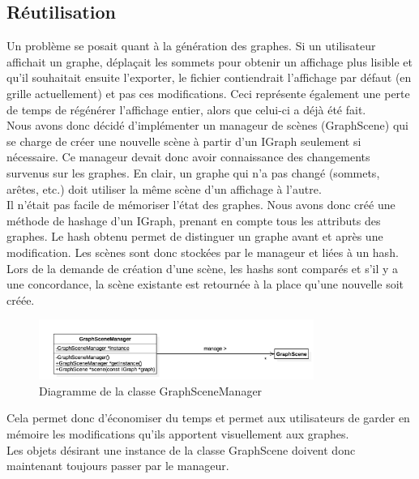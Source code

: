 \documentclass[french]{article}
\begin{document}
		\subsection{Réutilisation}
			Un problème se posait quant à la génération des graphes. Si un utilisateur affichait un graphe, déplaçait les sommets pour obtenir un affichage plus lisible et qu'il souhaitait ensuite l'exporter, le fichier contiendrait l'affichage par défaut (en grille actuellement) et pas ces modifications. Ceci représente également une perte de temps de régénérer l'affichage entier, alors que celui-ci a déjà été fait. \\
			Nous avons donc décidé d'implémenter un manageur de scènes (GraphScene) qui se charge de créer une nouvelle scène à partir d'un IGraph seulement si nécessaire. Ce manageur devait donc avoir connaissance des changements survenus sur les graphes. En clair, un graphe qui n'a pas changé (sommets, arêtes, etc.) doit utiliser la même scène d'un affichage à l'autre. \\
			
			Il n'était pas facile de mémoriser l'état des graphes. Nous avons donc créé une méthode de hashage d'un IGraph, prenant en compte tous les attributs des graphes. Le hash obtenu permet de distinguer un graphe avant et après une modification. Les scènes sont donc stockées par le manageur et liées à un hash. Lors de la demande de création d'une scène, les hashs sont comparés et s'il y a une concordance, la scène existante est retournée à la place qu'une nouvelle soit créée.
			
			\begin{figure}[H]
				\centering
				\includegraphics[width=0.8\textwidth]{Conception/visualization/graphscenemanager.png}
				\caption{Diagramme de la classe GraphSceneManager}
			\end{figure}
			
			Cela permet donc d'économiser du temps et permet aux utilisateurs de garder en mémoire les modifications qu'ils apportent visuellement aux graphes. \\
			
			Les objets désirant une instance de la classe GraphScene doivent donc maintenant toujours passer par le manageur.
			
\end{document}
